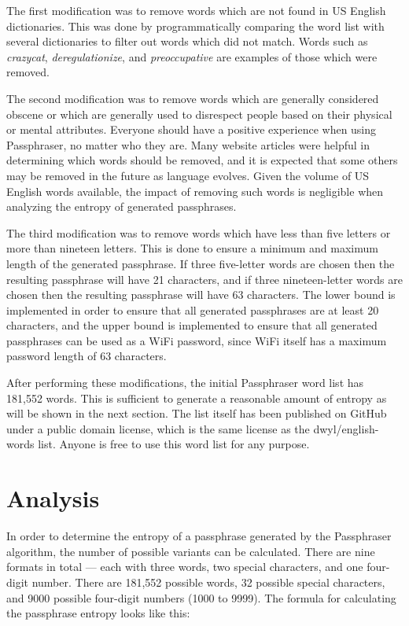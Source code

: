 \documentclass[
	a4paper, %
	10pt, %
	unnumberedsections, %
	twoside, %
]{LTJournalArticle}
\begin{document}
The first modification was to remove words which are not found in US English dictionaries. This was done by programmatically comparing the word list with several dictionaries to filter out words which did not match. Words such as \textit{crazycat}, \textit{deregulationize}, and \textit{preoccupative} are examples of those which were removed.

The second modification was to remove words which are generally considered obscene or which are generally used to disrespect people based on their physical or mental attributes. Everyone should have a positive experience when using Passphraser, no matter who they are. Many website articles were helpful in determining which words should be removed, and it is expected that some others may be removed in the future as language evolves. Given the volume of US English words available, the impact of removing such words is negligible when analyzing the entropy of generated passphrases.

The third modification was to remove words which have less than five letters or more than nineteen letters. This is done to ensure a minimum and maximum length of the generated passphrase. If three five-letter words are chosen then the resulting passphrase will have 21 characters, and if three nineteen-letter words are chosen then the resulting passphrase will have 63 characters. The lower bound is implemented in order to ensure that all generated passphrases are at least 20 characters, and the upper bound is implemented to ensure that all generated passphrases can be used as a WiFi password, since WiFi itself has a maximum password length of 63 characters.

After performing these modifications, the initial Passphraser word list has 181,552 words. This is sufficient to generate a reasonable amount of entropy as will be shown in the next section. The list itself has been published on GitHub under a public domain license, which is the same license as the dwyl/english-words list. Anyone is free to use this word list for any purpose.

\section{Analysis}

In order to determine the entropy of a passphrase generated by the Passphraser algorithm, the number of possible variants can be calculated. There are nine formats in total --- each with three words, two special characters, and one four-digit number. There are 181,552 possible words, 32 possible special characters, and 9000 possible four-digit numbers (1000 to 9999). The formula for calculating the passphrase entropy looks like this:
\end{document}
